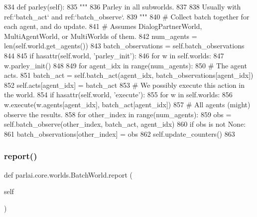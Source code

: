 \begin{DoxyCode}
834     \textcolor{keyword}{def }parley(self):
835         \textcolor{stringliteral}{"""}
836 \textcolor{stringliteral}{        Parley in all subworlds.}
837 \textcolor{stringliteral}{}
838 \textcolor{stringliteral}{        Usually with ref:`batch\_act` and ref:`batch\_observe`.}
839 \textcolor{stringliteral}{        """}
840         \textcolor{comment}{# Collect batch together for each agent, and do update.}
841         \textcolor{comment}{# Assumes DialogPartnerWorld, MultiAgentWorld, or MultiWorlds of them.}
842         num\_agents = len(self.world.get\_agents())
843         batch\_observations = self.batch\_observations
844 
845         \textcolor{keywordflow}{if} hasattr(self.world, \textcolor{stringliteral}{'parley\_init'}):
846             \textcolor{keywordflow}{for} w \textcolor{keywordflow}{in} self.worlds:
847                 w.parley\_init()
848 
849         \textcolor{keywordflow}{for} agent\_idx \textcolor{keywordflow}{in} range(num\_agents):
850             \textcolor{comment}{# The agent acts.}
851             batch\_act = self.batch\_act(agent\_idx, batch\_observations[agent\_idx])
852             self.acts[agent\_idx] = batch\_act
853             \textcolor{comment}{# We possibly execute this action in the world.}
854             \textcolor{keywordflow}{if} hasattr(self.world, \textcolor{stringliteral}{'execute'}):
855                 \textcolor{keywordflow}{for} w \textcolor{keywordflow}{in} self.worlds:
856                     w.execute(w.agents[agent\_idx], batch\_act[agent\_idx])
857             \textcolor{comment}{# All agents (might) observe the results.}
858             \textcolor{keywordflow}{for} other\_index \textcolor{keywordflow}{in} range(num\_agents):
859                 obs = self.batch\_observe(other\_index, batch\_act, agent\_idx)
860                 \textcolor{keywordflow}{if} obs \textcolor{keywordflow}{is} \textcolor{keywordflow}{not} \textcolor{keywordtype}{None}:
861                     batch\_observations[other\_index] = obs
862         self.update\_counters()
863 
\end{DoxyCode}
\mbox{\label{classparlai_1_1core_1_1worlds_1_1BatchWorld_af6ca90db5542bf4a74a122ea04ba8bef}} 
\subsubsection{\texorpdfstring{report()}{report()}}
{\footnotesize\ttfamily def parlai.\+core.\+worlds.\+Batch\+World.\+report (\begin{DoxyParamCaption}\item[{}]{self }\end{DoxyParamCaption})}

